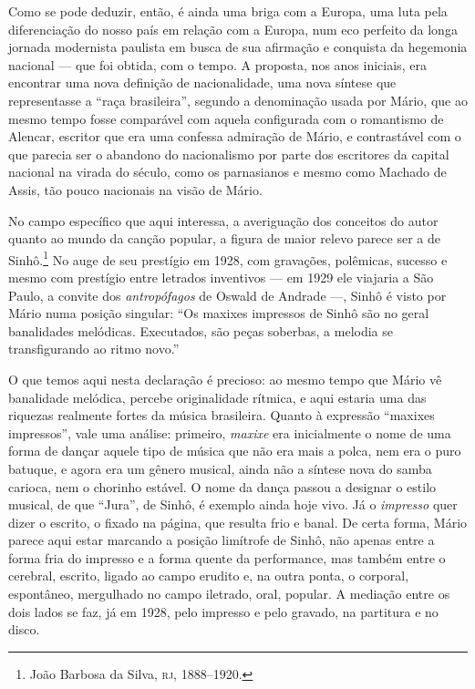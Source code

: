 Como se pode deduzir, então, é ainda uma briga com a Europa, uma luta
pela diferenciação do nosso país em relação com a Europa, num eco
perfeito da longa jornada modernista paulista em busca de sua afirmação
e conquista da hegemonia nacional --- que foi obtida, com o tempo. A
proposta, nos anos iniciais, era encontrar uma nova definição de
nacionalidade, uma nova síntese que representasse a ``raça brasileira'',
segundo a denominação usada por Mário, que ao mesmo tempo fosse
comparável com aquela configurada com o romantismo de Alencar, escritor
que era uma confessa admiração de Mário, e contrastável com o que
parecia ser o abandono do nacionalismo por parte dos escritores da
capital nacional na virada do século, como os parnasianos e mesmo como
Machado de Assis, tão pouco nacionais na visão de Mário.

No campo específico que aqui interessa, a averiguação dos conceitos do
autor quanto ao mundo da canção popular, a figura de maior relevo parece
ser a de Sinhô.\footnote{João Barbosa da Silva, \textsc{rj}, 1888--1920.} No auge de seu
prestígio em 1928, com gravações, polêmicas, sucesso e mesmo com
prestígio entre letrados inventivos --- em 1929 ele viajaria a São Paulo,
a convite dos \textit{antropófagos} de Oswald de Andrade ---, Sinhô é visto
por Mário numa posição singular: ``Os maxixes impressos de Sinhô são no
geral banalidades melódicas. Executados, são peças soberbas, a melodia
se transfigurando ao ritmo novo.''

O que temos aqui nesta declaração é precioso: ao mesmo tempo que Mário
vê banalidade melódica, percebe originalidade rítmica, e aqui estaria
uma das riquezas realmente fortes da música brasileira. Quanto à
expressão ``maxixes impressos'', vale uma análise: primeiro, \textit{maxixe}
era inicialmente o nome de uma forma de dançar aquele tipo de música que
não era mais a polca, nem era o puro batuque, e agora era um gênero
musical, ainda não a síntese nova do samba carioca, nem o chorinho
estável. O nome da dança passou a designar o estilo musical, de que
``Jura'', de Sinhô, é exemplo ainda hoje vivo. Já o \textit{impresso} quer
dizer o escrito, o fixado na página, que resulta frio e banal. De certa
forma, Mário parece aqui estar marcando a posição limítrofe de Sinhô,
não apenas entre a forma fria do impresso e a forma quente da
performance, mas também entre o cerebral, escrito, ligado ao campo
erudito e, na outra ponta, o corporal, espontâneo, mergulhado no campo
iletrado, oral, popular. A mediação entre os dois lados se faz, já em
1928, pelo impresso e pelo gravado, na partitura e no disco.

